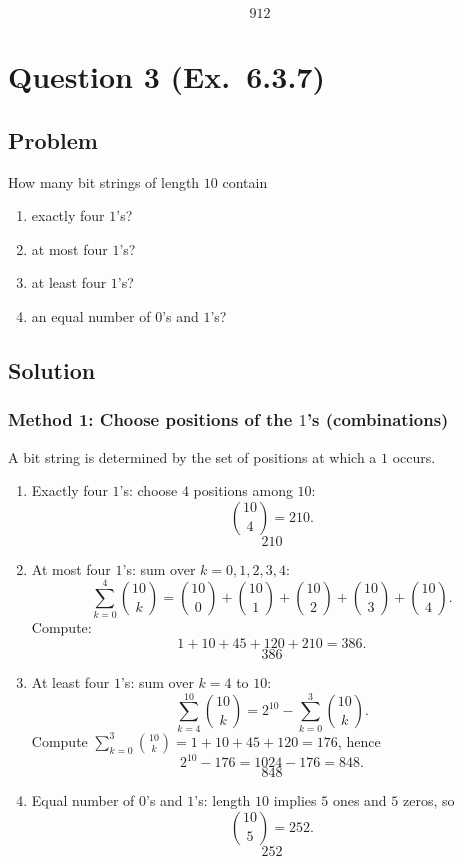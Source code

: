 \documentclass[12pt]{article}
\begin{document}
\[
\boxed{912}
\]

\newpage

\section{Question 3 (Ex.\ 6.3.7)}
\subsection{Problem}
How many bit strings of length $10$ contain
\begin{enumerate}[label=(\alph*)]
\item exactly four $1$'s?
\item at most four $1$'s?
\item at least four $1$'s?
\item an equal number of $0$'s and $1$'s?
\end{enumerate}

\subsection{Solution}

\subsubsection{Method 1: Choose positions of the $1$'s (combinations)}
A bit string is determined by the set of positions at which a $1$ occurs.

\begin{enumerate}[label=(\alph*)]
\item Exactly four $1$'s: choose $4$ positions among $10$:
\[
\binom{10}{4}=210.
\]
\[
\boxed{210}
\]

\item At most four $1$'s: sum over $k=0,1,2,3,4$:
\[
\sum_{k=0}^{4}\binom{10}{k}
=\binom{10}{0}+\binom{10}{1}+\binom{10}{2}+\binom{10}{3}+\binom{10}{4}.
\]
Compute:
\[
1+10+45+120+210=386.
\]
\[
\boxed{386}
\]

\item At least four $1$'s: sum over $k=4$ to $10$:
\[
\sum_{k=4}^{10}\binom{10}{k}
=2^{10}-\sum_{k=0}^{3}\binom{10}{k}.
\]
Compute $\sum_{k=0}^{3}\binom{10}{k}=1+10+45+120=176$, hence
\[
2^{10}-176=1024-176=848.
\]
\[
\boxed{848}
\]

\item Equal number of $0$'s and $1$'s: length $10$ implies $5$ ones and $5$ zeros, so
\[
\binom{10}{5}=252.
\]
\[
\boxed{252}
\]
\end{enumerate}
\end{document}
